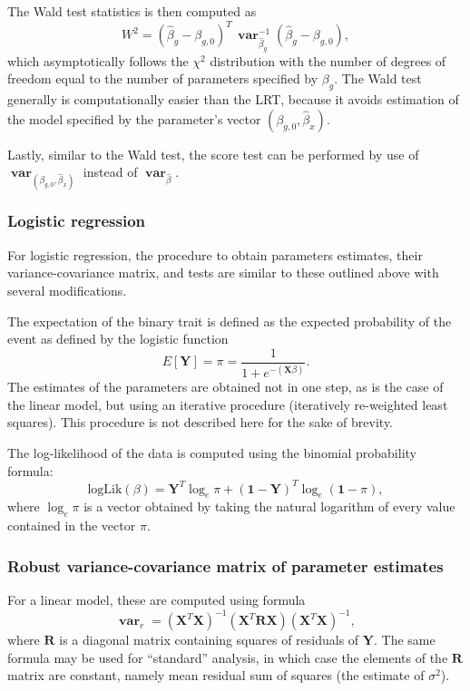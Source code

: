 \documentclass[12pt,a4paper]{article}
\DeclareMathOperator{\var}{\mathbf{var}}
\begin{document}
The Wald test statistics is then computed as
$$
W^2 = (\hat{\beta}_g - \beta_{g,0})^T \,
\var_{\hat{\beta}_g}^{-1} (\hat{\beta}_g - \beta_{g,0}),
$$
which asymptotically follows the $\chi^2$ distribution with the number
of degrees of freedom equal to the number of parameters specified by
$\beta_g$. The Wald test generally is computationally easier than the
LRT, because it avoids estimation of the model specified by the
parameter's vector $(\beta_{g,0},\hat{\beta}_x)$.

Lastly, similar to the Wald test, the score test can be performed by use
of $\var_{(\beta_{g,0},\hat{\beta}_x)}$ instead of $\var_{\hat{\beta}}$.


\subsubsection{Logistic regression}
For logistic regression, the procedure to obtain
parameters estimates, their variance-covariance matrix, and tests are
similar to these outlined above with several modifications.

The expectation of the binary trait is defined as the expected
probability of the event as defined by the logistic
function
$$
E[\mathbf{Y}] = \pi = \frac{ 1 }{ 1 + e^{-(\mathbf{X}\beta)} }.
$$
The estimates of the parameters are obtained not in one
step, as is the case of the linear model, but using an iterative
procedure (iteratively re-weighted least squares). This
procedure is not described here for the sake of brevity.

The log-likelihood of the data is computed using the
binomial probability formula:
$$
\mathrm{logLik}(\beta) = \mathbf{Y}^T \log_e \pi + (\mathbf{1} -
\mathbf{Y})^T \log_e (\mathbf{1}-\pi),
$$
where $\log_e \pi$ is a vector obtained by taking the natural
logarithm of every value contained in the vector $\pi$.

\subsubsection{Robust variance-covariance matrix of parameter estimates}
For a linear model, these are computed using formula
$$
\var_r = (\mathbf{X}^T\mathbf{X})^{-1} (\mathbf{X}^T\mathbf{R}\mathbf{X})
(\mathbf{X}^T\mathbf{X})^{-1},
$$
where $\mathbf{R}$ is a diagonal matrix containing squares of residuals
of $\mathbf{Y}$. The
same formula may be used for ``standard'' analysis, in which case
the elements of the $\mathbf{R}$ matrix are constant, namely mean
residual sum of squares (the estimate of $\sigma^2$).
\end{document}
